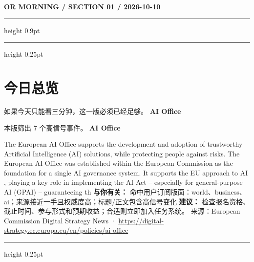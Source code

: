 \documentclass[10.5pt]{ctexart}
\begin{document}
{\small\bfseries OR MORNING / SECTION 01 / 2026-10-10}
\vspace{2mm}
\hrule height 0.9pt
\vspace{1.5mm}
\hrule height 0.25pt
\vspace{4mm}
\section*{今日总览}
{\color{ormuted} 如果今天只能看三分钟，这一版必须已经足够。}
\vspace{2mm}
{\fontsize{25}{29}\selectfont\bfseries AI Office}\par
\vspace{2mm}
{\large 本版筛出 7 个高信号事件。}
\vspace{3mm}
{\Large\bfseries AI Office}\par
The European AI Office supports the development and adoption of trustworthy Artificial Intelligence (AI) solutions, while protecting people against risks. The European AI Office was established within the European Commission as the foundation for a single AI governance system. It supports the EU approach to AI , playing a key role in implementing the AI Act – especially for general-purpose AI (GPAI) – guaranteeing th
\textbf{与你有关：} 命中用户订阅版面：world、business、ai；来源接近一手且权威度高；标题/正文包含高信号变化
\textbf{建议：} 检查报名资格、截止时间、参与形式和预期收益；合适则立即加入任务系统。
{\footnotesize\color{ormuted} 来源：European Commission Digital Strategy News · \url{https://digital-strategy.ec.europa.eu/en/policies/ai-office}}
\vspace{3mm}
\hrule height 0.25pt
\vspace{3mm}
\end{document}
